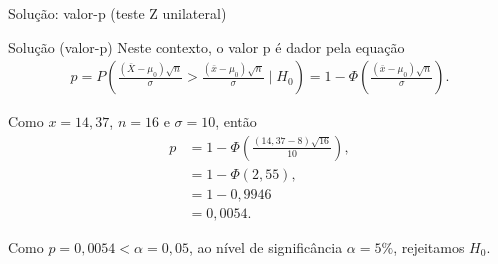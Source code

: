 \documentclass[8pt]{beamer}
\begin{document}
\begin{frame}{Solução: valor-p (teste Z unilateral)}

\begin{block}{Solução (valor-p)}
	Neste contexto, o valor p é dador pela equação
\begin{align*}
p = P\left( \frac{(\bar{X} - \mu_0)\sqrt{n}}{\sigma} > \frac{(\bar{x} - \mu_0)\sqrt{n}}{\sigma}  \mid H_0  \right) = 1 - \Phi \left( \frac{(\bar{x} - \mu_0)\sqrt{n}}{\sigma} \right).
\end{align*}
\vfill

Como $x=14,37$, $n=16$ e $\sigma=10$, então
\begin{align*}
p &= 1 - \Phi \left( \frac{(14,37 - 8)\sqrt{16}}{10} \right),\\
&= 1- \Phi\left( 2,55 \right),\\
&= 1 - 0,9946\\
&= 0,0054.
\end{align*}
\vfill

Como $p=0,0054 < \alpha=0,05$, ao nível de significância $\alpha = 5\%$, rejeitamos $H_0$.	
\end{block}

\end{frame}
\end{document}
